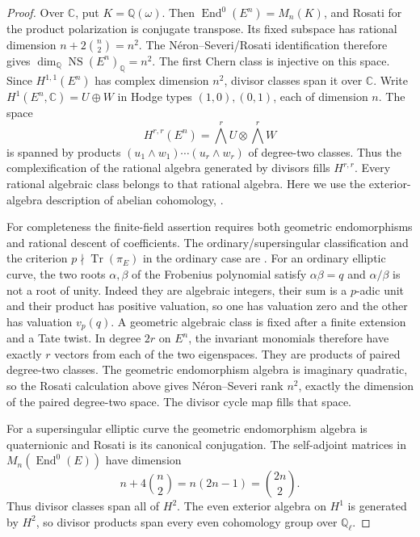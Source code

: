 \begin{proof}
Over $\mathbb C$, put $K=\mathbb Q(\omega)$. Then
$\operatorname{End}^0(E^n)=M_n(K)$, and Rosati for the product polarization is conjugate transpose. Its fixed subspace has rational dimension
$n+2\binom n2=n^2$. The N\'eron--Severi/Rosati identification
\cite[Prop.~13.1]{MilneAV} therefore gives $\dim_{\mathbb Q}\operatorname{NS}(E^n)_{\mathbb Q}=n^2$. The first Chern class is injective on this space. Since $H^{1,1}(E^n)$ has complex dimension $n^2$, divisor classes span it over $\mathbb C$.
Write $H^1(E^n,\mathbb C)=U\oplus W$ in Hodge types $(1,0),(0,1)$, each of dimension $n$. The space
\[
 H^{r,r}(E^n)=\bigwedge^rU\otimes\bigwedge^rW
\]
is spanned by products $(u_1\wedge w_1)\cdots(u_r\wedge w_r)$ of degree-two classes. Thus the complexification of the rational algebra generated by divisors fills $H^{r,r}$. Every rational algebraic class belongs to that rational algebra. Here we use the exterior-algebra description of abelian cohomology, \cite[Th.~11.1(b), and Th.~2.3 for Betti cohomology]{MilneAV}.

For completeness the finite-field assertion requires both geometric endomorphisms and rational descent of coefficients. The ordinary/supersingular classification and the criterion $p\nmid\operatorname{Tr}(\pi_E)$ in the ordinary case are \cite[Th.~13.3, Th.~13.18, Cor.~13.20]{SutherlandEC}. For an ordinary elliptic curve, the two roots $\alpha,\beta$ of the Frobenius polynomial satisfy $\alpha\beta=q$ and $\alpha/\beta$ is not a root of unity. Indeed they are algebraic integers, their sum is a $p$-adic unit and their product has positive valuation, so one has valuation zero and the other has valuation $v_p(q)$. A geometric algebraic class is fixed after a finite extension and a Tate twist. In degree $2r$ on $E^n$, the invariant monomials therefore have exactly $r$ vectors from each of the two eigenspaces. They are products of paired degree-two classes. The geometric endomorphism algebra is imaginary quadratic, so the Rosati calculation above gives N\'eron--Severi rank $n^2$, exactly the dimension of the paired degree-two space. The divisor cycle map fills that space.

For a supersingular elliptic curve the geometric endomorphism algebra is quaternionic and Rosati is its canonical conjugation. The self-adjoint matrices in $M_n(\operatorname{End}^0(E))$ have dimension
\[
 n+4\binom n2=n(2n-1)=\binom{2n}{2}.
\]
Thus divisor classes span all of $H^2$. The even exterior algebra on $H^1$ is generated by $H^2$, so divisor products span every even cohomology group over $\mathbb Q_\ell$.


\end{proof}
